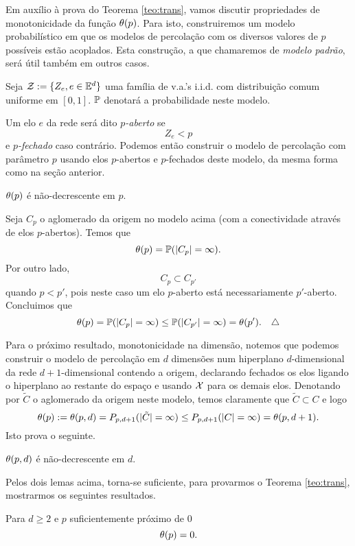 Em auxílio à prova do Teorema \ref{teo:trans}, vamos discutir propriedades 
de monotonicidade da função $\theta(p)$.  Para isto, construiremos um
modelo probabilístico em que 
os modelos de percolação com os
diversos valores de $p$ possíveis estão acoplados.
Esta construção, a que chamaremos de {\em modelo padrão},  
será útil também em outros casos.

Seja ${\cal Z}:=\{Z_e, e\in\mathbb{E}^d\}$ uma 
família de
v.a.'s i.i.d. com distribuição
comum uniforme em $[0,1]$. $\mathbb{P}$ denotará a probabilidade neste modelo.

Um elo $e$ da rede será dito {\em $p$-aberto} se $$Z_e<p$$ e {\em $p$-fechado} caso
contrário. Podemos então construir o modelo de percolação
com parâmetro $p$ usando elos $p$-abertos e $p$-fechados deste modelo, 
da mesma forma como na seção anterior.

\vs

\blem
\label{lem:tep}
$\theta(p)$ é não-decrescente em $p$.
\elem

\vs


Seja $C_p$ o aglomerado da origem no modelo acima
(com a conectividade através de elos $p$-abertos). Temos que $$\theta(p)=\mathbb{P}(|C_p|=\infty).$$
Por outro lado, $$C_p\subset C_{p'}$$ quando $p<p'$, pois neste caso 
um elo $p$-aberto está necessariamente $p'$-aberto.
Concluimos que $$\theta(p)=\mathbb{P}(|C_p|=\infty)\leq\mathbb{P}(|C_{p'}|=\infty)=\theta(p').\quad\triangle$$

\vs

Para o próximo resultado, monotonicidade na dimensão, notemos que podemos construir 
o modelo de percolação em $d$ dimensões num hiperplano $d$-dimensional da rede 
$d+1$-dimensional contendo a origem, declarando fechados os elos ligando o 
hiperplano ao restante do espaço e usando ${\cal X}$ para os demais elos. 
Denotando por $\tilde C$ o aglomerado da origem neste modelo, temos claramente que
$\tilde C\subset C$ e logo $$\theta(p):=\theta(p,d)=P_{p,d+1}(|\tilde C|=\infty)\leq
P_{p,d+1}(|C|=\infty)=\theta(p,d+1).$$ Isto prova o seguinte.   

\vs

\blem
\label{lem:ted}
$\theta(p,d)$ é não-decrescente em $d$.
\elem

\vs

Pelos dois lemas acima, torna-se suficiente, para provarmos o Teorema \ref{teo:trans},
mostrarmos os seguintes resultados.

\bprop
\label{prop:trans1}
Para $d\geq2$ e $p$ suficientemente próximo de $0$ $$\theta(p)=0.$$
\eprop

